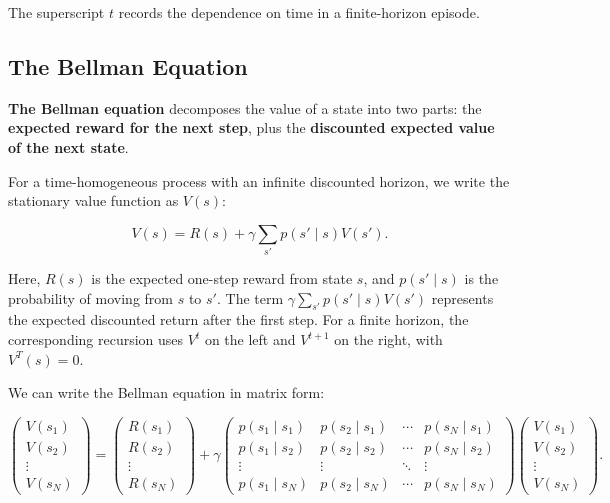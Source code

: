 \documentclass[a4paper,10pt]{article}
\begin{document}
The superscript \(t\) records the dependence on time in a finite-horizon episode.

\subsection{The Bellman Equation}

\textbf{The Bellman equation} decomposes the value of a state into two parts: the \textbf{expected reward for the next step}, plus the \textbf{discounted expected value of the next state}.

For a time-homogeneous process with an infinite discounted horizon, we write the stationary value function as \(V(s)\):

\[
V(s)=R(s)+\gamma\sum_{s'}p(s'\mid s)V(s').
\]

Here, \(R(s)\) is the expected one-step reward from state \(s\), and \(p(s'\mid s)\) is the probability of moving from \(s\) to \(s'\). The term \(\gamma\sum_{s'}p(s'\mid s)V(s')\) represents the expected discounted return after the first step. For a finite horizon, the corresponding recursion uses \(V^t\) on the left and \(V^{t+1}\) on the right, with \(V^T(s)=0\).

We can write the Bellman equation in matrix form:

\[
\begin{pmatrix}
V(s_1) \\
V(s_2) \\
\vdots \\
V(s_N)
\end{pmatrix}
=
\begin{pmatrix}
R(s_1) \\
R(s_2) \\
\vdots \\
R(s_N)
\end{pmatrix}
+\gamma
\begin{pmatrix}
p(s_1\mid s_1) & p(s_2\mid s_1) & \cdots & p(s_N\mid s_1) \\
p(s_1\mid s_2) & p(s_2\mid s_2) & \cdots & p(s_N\mid s_2) \\
\vdots & \vdots & \ddots & \vdots \\
p(s_1\mid s_N) & p(s_2\mid s_N) & \cdots & p(s_N\mid s_N)
\end{pmatrix}
\begin{pmatrix}
V(s_1) \\
V(s_2) \\
\vdots \\
V(s_N)
\end{pmatrix}.
\]
\end{document}
